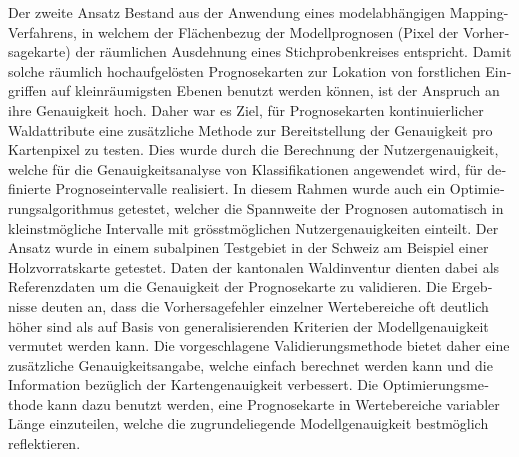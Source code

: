 \begin{otherlanguage}{ngerman}
Der zweite Ansatz Bestand aus der Anwendung eines modelabhängigen Mapping-Verfahrens, in welchem der Flächenbezug der Modellprognosen (Pixel der Vorhersagekarte) der räumlichen Ausdehnung eines Stichprobenkreises entspricht. Damit solche räumlich hochaufgelösten Prognosekarten zur Lokation von forstlichen Eingriffen auf kleinräumigsten Ebenen benutzt werden können, ist der Anspruch an ihre Genauigkeit hoch. Daher war es Ziel, für Prognosekarten kontinuierlicher Waldattribute eine zusätzliche Methode zur Bereitstellung der Genauigkeit pro Kartenpixel zu testen. Dies wurde durch die Berechnung der Nutzergenauigkeit, welche für die Genauigkeitsanalyse von Klassifikationen angewendet wird, für definierte Prognoseintervalle realisiert. In diesem Rahmen wurde auch ein Optimierungsalgorithmus getestet, welcher die Spannweite der Prognosen automatisch in kleinstmögliche Intervalle mit grösstmöglichen Nutzergenauigkeiten einteilt. Der Ansatz wurde in einem subalpinen Testgebiet in der Schweiz am Beispiel einer Holzvorratskarte getestet. Daten der kantonalen Waldinventur dienten dabei als Referenzdaten um die Genauigkeit der Prognosekarte zu validieren. Die Ergebnisse deuten an, dass die Vorhersagefehler einzelner Wertebereiche oft deutlich höher sind als auf Basis von generalisierenden Kriterien der Modellgenauigkeit vermutet werden kann. Die vorgeschlagene Validierungsmethode bietet daher eine zusätzliche Genauigkeitsangabe, welche einfach berechnet werden kann und die Information bezüglich der Kartengenauigkeit verbessert. Die Optimierungsmethode kann dazu benutzt werden, eine Prognosekarte in Wertebereiche variabler Länge einzuteilen, welche die zugrundeliegende Modellgenauigkeit bestmöglich reflektieren.

\end{otherlanguage}



